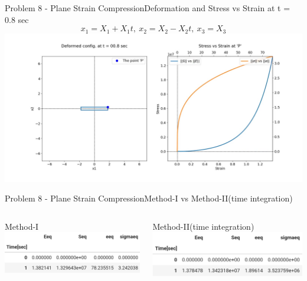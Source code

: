 \documentclass{beamer}
\begin{document}
\begin{frame}{Problem 8 - Plane Strain Compression}{Deformation and Stress vs Strain at t = 0.8 sec}
    \vspace{-1em}
    \scriptsize $$x_1 = X_1 + X_1t,\ x_2 = X_2 - X_2t,\ x_3 = X_3$$
    \includegraphics[width=\textwidth, trim={4.5cm 2cm 3cm 1cm}, clip]{Plots/pscompression.jpg}
\end{frame}

\begin{frame}{Problem 8 - Plane Strain Compression}{Method-I vs Method-II(time integration)}
    \vspace{-2em}
    \begin{columns}
        \begin{block}{\footnotesize Method-I}
            \includegraphics[width=\textwidth]{Values/m2t8.png}
        \end{block}
        \begin{block}{\footnotesize Method-II(time integration)}
            \includegraphics[width=\textwidth]{Values/m1t8.png}
        \end{block}
    \end{columns}
\end{frame}
\end{document}
